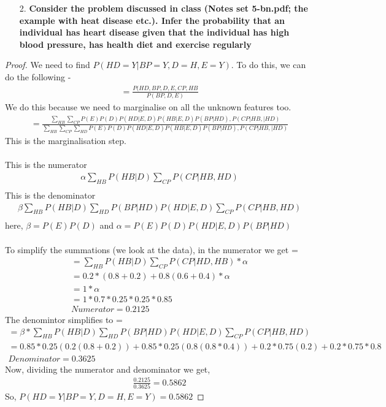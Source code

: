 \documentclass{article}
\theoremstyle{case}
\begin{document}
\begin{enumerate}
    \item [2.] \textbf{Consider the problem discussed in class (Notes set 5-bn.pdf; the example
with heat disease etc.). Infer the probability that an individual has heart
disease given that the individual has high blood pressure, has health diet
and exercise regularly}
\end{enumerate}
\begin{proof}
We need to find $P(HD = Y|BP=Y,D = H, E = Y)$. To do this, we can do the following - 
\begin{gather*}
    = \frac{P(HD, BP, D, E, CP, HB}{P(BP, D, E)}
\end{gather*}
We do this because we need to marginalise on all the unknown features too.
\begin{gather*}
    = \frac{\sum_{HB}\sum_{CP}P(E)P(D)P(HD|E,D)P(HB|E,D)P(BP|HD),P(CP|HB,|HD)}{\sum_{HB}\sum_{CP}\sum_{HD}P(E)P(D)P(HD|E,D)P(HB|E,D)P(BP|HD),P(CP|HB,|HD)}
\end{gather*}
This is the marginalisation step. \\ \\
This is the numerator
\begin{gather*}
    \alpha \sum_{HB}P(HB|D)\sum_{CP}P(CP|HB,HD)\\
    \end{gather*}
    This is the denominator
    \begin{gather*}
    \beta \sum_{HB}P(HB|D)\sum_{HD}P(BP|HD)P(HD|E,D)\sum_{CP}P(CP|HB,HD) \\
    \end{gather*}
here, $\beta = P(E)P(D)$ and $\alpha = P(E)P(D) P(HD|E,D) P(BP|HD)$ \\ \\
To simplify the summations (we look at the data), in the numerator we get = 
\begin{gather*}
= \sum_{HB}P(HB|D)\sum_{CP}P(CP|HD,HB) * \alpha\\
= 0.2 * (0.8+0.2) + 0.8(0.6+0.4) *\alpha \\ 
= 1 * \alpha \\
= 1* 0.7*0.25*0.25*0.85\\
Numerator = 0.2125
\end{gather*}
The denomintor simplifies to = 
\begin{gather*}
    = \beta * \sum_{HB}P(HB|D)\sum_{HD}P(BP|HD)P(HD|E,D)\sum_{CP}P(CP|HB,HD)\\
    = 0.85 * 0.25 (0.2(0.8+0.2)) + 0.85 * 0.25(0.8 (0.8*0.4)) + 0.2*0.75(0.2) + 0.2*0.75*0.8 \\
    Denominator = 0.3625
\end{gather*}
Now, dividing the numerator and denominator we get, 
\begin{gather*}
    \frac{0.2125}{0.3625} = 0.5862
\end{gather*}
So, $P(HD = Y|BP=Y,D = H, E = Y) = 0.5862$
\end{proof}
\end{document}
